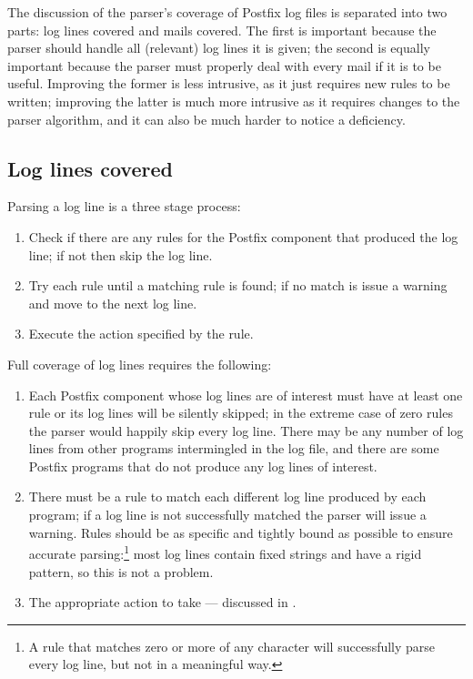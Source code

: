 \label{parsing coverage}

The discussion of the parser's coverage of Postfix log files is separated
into two parts: log lines covered and mails covered.  The first is
important because the parser should handle all (relevant) log lines it is
given; the second is equally important because the parser must properly
deal with every mail if it is to be useful.  Improving the former is
less intrusive, as it just requires new rules to be written; improving the
latter is much more intrusive as it requires changes to the parser
algorithm, and it can also be much harder to notice a deficiency.

\subsection{Log lines covered}

\label{log-lines-covered}

Parsing a log line is a three stage process:

\begin{enumerate}

    \item Check if there are any rules for the Postfix component that
        produced the log line; if not then skip the log line.

    \item Try each rule until a matching rule is found; if no match is
        issue a warning and move to the next log line.

    \item Execute the action specified by the rule.

\end{enumerate}

Full coverage of log lines requires the following:

\begin{enumerate}

    \item Each Postfix component whose log lines are of interest must have
        at least one rule or its log lines will be silently skipped; in the
        extreme case of zero rules the parser would happily skip every log
        line.  There may be any number of log lines from other programs
        intermingled in the log file, and there are some Postfix programs
        that do not produce any log lines of interest.

    \item There must be a rule to match each different log line produced by
        each program; if a log line is not successfully matched the parser
        will issue a warning.  Rules should be as specific and tightly
        bound as possible to ensure accurate parsing:\footnote{A rule that
        matches zero or more of any character will successfully parse every
        log line, but not in a meaningful way.} most log lines contain
        fixed strings and have a rigid pattern, so this is not a problem.

    \item The appropriate action to take --- discussed in
        .

\end{enumerate}

